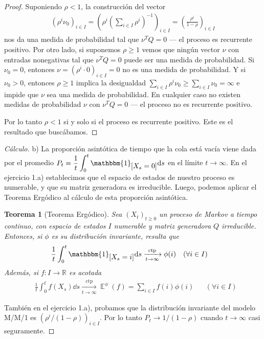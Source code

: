 \documentclass{article}
\DeclareMathOperator{\Exp}{\mathbb{E}}
\newcommand{\realnum}{\mathbb{R}}
\newcommand{\characteristic}{\mathbbm{1}}
\newcommand{\almostSurely}{\text{ctp}}
\newtheorem{theorem}{Teorema}
\theoremstyle{definition}
\begin{document}
\begin{proof}
Suponiendo \(\rho < 1\), la construcción del vector 
\begin{align}
	\left( \rho^i \nu_0 \right)_{i \in I}
	=
	\left( \rho^i \left(\sum_{i \in I} \rho^i\right)^{- 1} \right)_{i \in I}
	=
	\left( \frac{\rho^i}{1 - \rho} \right)_{i \in I}
\end{align}
nos da una medida de probabilidad tal que \(\nu^T Q = 0\) --- el proceso es recurrente positivo.
Por otro lado, si suponemos \(\rho \geq 1\) vemos que ningún vector \(\nu\) con entradas nonegativas tal que \(\nu^T Q = 0\) puede ser una medida de probabilidad.
Si \(\nu_0 = 0\), entonces \(\nu = (\rho^i \cdot 0)_{i \in I} = 0\) no es una medida de probabilidad.
Y si \(\nu_0 > 0\), entonces \(\rho \geq 1\) implica la desigualdad \(\sum_{i \in I} \rho^i \nu_0 \geq \sum_{i \in I} \nu_0 = \infty\) e impide que \(\nu\) sea una medida de probabilidad.
En cualquier caso no existen medidas de probabilidad \(\nu\) con \(\nu^T Q = 0\) --- el proceso no es recurrente positivo.

Por lo tanto \(\rho < 1\) si y solo si el proceso es recurrente positivo.
Este es el resultado que buscábamos.
\end{proof}

\begin{proof}[Cálculo] b)
La proporción asintótica de tiempo que la cola está vacía viene dada por el promedio \(P_t = {\displaystyle \frac{1}{t} \int_0^t \characteristic_{\displaystyle [X_s = 0]} \dd s}\) en el límite \(t \rightarrow \infty\).
En el ejercicio 1.a) establecimos que el espacio de estados de nuestro proceso es numerable, y que su matriz generadora es irreducible.
Luego, podemos aplicar el Teorema Ergódico al cálculo de esta proporción asintótica. 
\begin{theorem}[Teorema Ergódico]
\label{theorem:ErgodicTheoremForMarkovProcesses}
Sea \((X_t)_{t \geq 0}\) un proceso de Markov a tiempo continuo, con espacio de estados \(I\) numerable y matriz generadora \(Q\) irreducible.
Entonces, si \(\phi\) es su distribución invariante, resulta que
\begin{align}
	&\frac{1}{t} \int_0^t \characteristic_{\displaystyle [X_s = i]} \dd s
	\xrightarrow[t \rightarrow \infty]{\almostSurely}
	\phi(i)
	&&(\forall i \in I)
\end{align}
Además, si \(f : I \rightarrow \realnum\) es acotada
\begin{align}
	&\frac{1}{t} \int_0^t f(X_s) \dd s
	\xrightarrow[t \rightarrow \infty]{\almostSurely}
	\Exp^{\phi}(f) = \sum_{i \in I} f(i) \phi(i)
	&&(\forall i \in I)
\end{align}
\end{theorem}
También en el ejercicio 1.a), probamos que la distribución invariante del modelo M/M/1 es \((\rho^i / (1 - \rho))_{i \in I}\).
Por lo tanto \(P_t \rightarrow 1 / (1 - \rho)\) cuando \(t \rightarrow \infty\) casi seguramente.
\end{proof}
\endgroup
\end{document}
